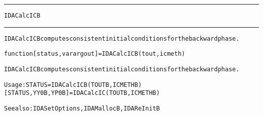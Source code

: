 \begin{samepage}
\hrule
\begin{center}
{\large \verb!IDACalcICB!}
\label{p:IDACalcICB}
\end{center}
\hrule\vspace{0.1in}



\begin{alltt}
IDACalcICB computes consistent initial conditions for the backward phase.
\end{alltt}

\end{samepage}



\begin{samepage}


\begin{alltt}
function [status, varargout] = IDACalcICB(tout,icmeth) 
\end{alltt}

\end{samepage}



\begin{alltt}
IDACalcICB computes consistent initial conditions for the backward phase.

   Usage: STATUS = IDACalcICB ( TOUTB, ICMETHB )
          [STATUS, YY0B, YP0B] = IDACalcIC ( TOUTB, ICMETHB )

  See also: IDASetOptions, IDAMallocB, IDAReInitB
\end{alltt}






\vspace{0.1in}